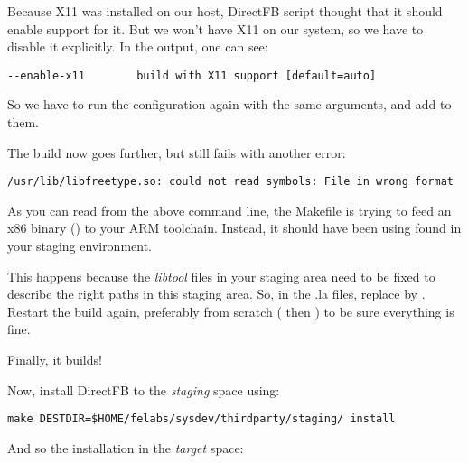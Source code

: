 Because X11 was installed on our host, DirectFB 
script thought that it should enable support for it. But we won't have
X11 on our system, so we have to disable it explicitly. In the
 output, one can see:

\begin{verbatim}
--enable-x11		build with X11 support [default=auto]
\end{verbatim}

So we have to run the configuration again with the same arguments, and
add  to them.

The build now goes further, but still fails with another error:

\begin{verbatim}
/usr/lib/libfreetype.so: could not read symbols: File in wrong format
\end{verbatim}

As you can read from the above command line, the Makefile is trying to
feed an x86 binary () to your ARM
toolchain. Instead, it should have been using
 found in your staging environment.

This happens because the {\em libtool}  files in your
staging area need to be fixed to describe the right paths in this
staging area. So, in the .la files, replace 
by
. Restart
the build again, preferably from scratch ( then
) to be sure everything is fine.

Finally, it builds!

Now, install DirectFB to the {\em staging} space using:

\begin{verbatim}
make DESTDIR=$HOME/felabs/sysdev/thirdparty/staging/ install
\end{verbatim}

And so the installation in the {\em target} space:

